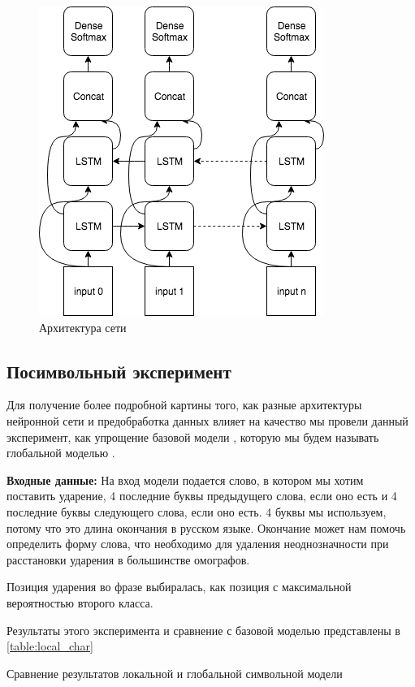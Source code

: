 \documentclass[14pt, a4paper, russian]{report}
\begin{document}
\begin{normalsize}
\begin{figure}[H]
	\begin{center}
		\includegraphics[width=0.5\linewidth]{Local}
	\end{center}
	\caption{\small{Архитектура сети}}
	\label{fig:local}
\end{figure}


\subsection{Посимвольный эксперимент}
Для получение более подробной картины того, как разные архитектуры нейронной сети и предобработка данных влияет на качество мы провели данный эксперимент, как упрощение базовой модели \cite{ponomareva}, которую мы будем называть глобальной моделью .

\textbf{Входные данные:} На вход модели подается слово, в котором мы хотим поставить ударение, 4 последние буквы предыдущего слова, если оно есть и 4 последние буквы следующего слова, если оно есть. 4 буквы мы используем, потому что это  длина  окончания в русском языке. Окончание может нам помочь определить форму слова, что необходимо для удаления неоднозначности при расстановки ударения в большинстве омографов.

Позиция ударения во фразе выбиралась, как позиция с максимальной вероятностью второго класса.

Результаты этого эксперимента и сравнение с базовой моделью представлены в \cref{table:local_char}

\begin{table}[H]
		\caption{Сравнение результатов локальной и глобальной символьной модели}
	

\end{table}
\end{normalsize}
\end{document}

